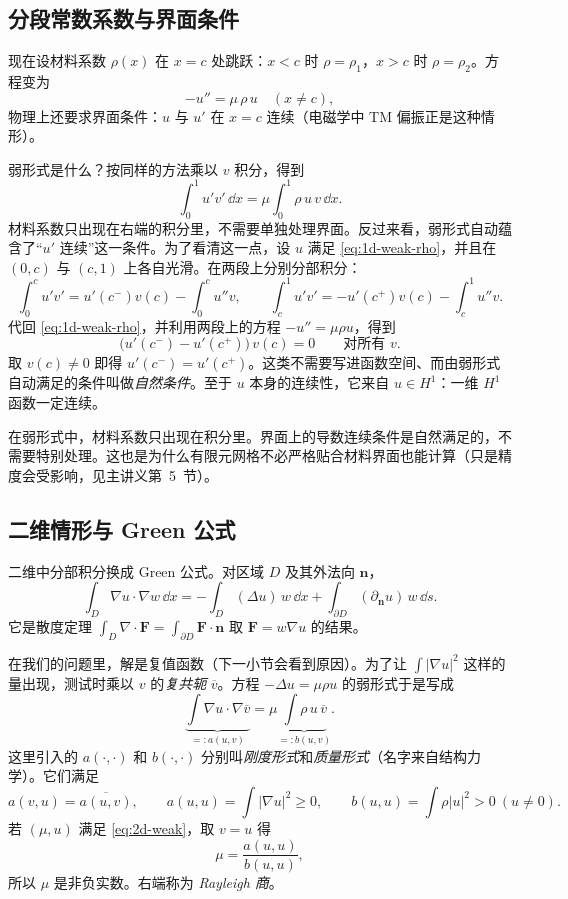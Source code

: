 \documentclass[11pt,a4paper,fontset=fandol]{ctexart}
\begin{document}
\subsection{分段常数系数与界面条件}

现在设材料系数 $\rho(x)$ 在 $x=c$ 处跳跃：$x<c$ 时 $\rho=\rho_1$，$x>c$ 时 $\rho=\rho_2$。方程变为
\[
-u''=\mu\,\rho\,u\quad (x\ne c),
\]
物理上还要求界面条件：$u$ 与 $u'$ 在 $x=c$ 连续（电磁学中 TM 偏振正是这种情形）。

弱形式是什么？按同样的方法乘以 $v$ 积分，得到
\begin{equation}
\label{eq:1d-weak-rho}
\int_0^1 u'v'\,\dd x=\mu\int_0^1 \rho\,u\,v\,\dd x .
\end{equation}
材料系数只出现在右端的积分里，不需要单独处理界面。反过来看，弱形式自动蕴含了“$u'$ 连续”这一条件。为了看清这一点，设 $u$ 满足 \eqref{eq:1d-weak-rho}，并且在 $(0,c)$ 与 $(c,1)$ 上各自光滑。在两段上分别分部积分：
\[
\int_0^c u'v'=u'(c^-)v(c)-\int_0^c u''v,\qquad
\int_c^1 u'v'=-u'(c^+)v(c)-\int_c^1 u''v .
\]
代回 \eqref{eq:1d-weak-rho}，并利用两段上的方程 $-u''=\mu\rho u$，得到
\[
\bigl(u'(c^-)-u'(c^+)\bigr)\,v(c)=0\qquad\text{对所有 }v .
\]
取 $v(c)\ne0$ 即得 $u'(c^-)=u'(c^+)$。这类不需要写进函数空间、而由弱形式自动满足的条件叫做\emph{自然条件}。至于 $u$ 本身的连续性，它来自 $u\in H^1$：一维 $H^1$ 函数一定连续。

\begin{keypoint}
在弱形式中，材料系数只出现在积分里。界面上的导数连续条件是自然满足的，不需要特别处理。这也是为什么有限元网格不必严格贴合材料界面也能计算（只是精度会受影响，见主讲义第~5~节）。
\end{keypoint}

\subsection{二维情形与 Green 公式}

二维中分部积分换成 Green 公式。对区域 $D$ 及其外法向 $\bm n$，
\begin{equation}
\label{eq:green}
\int_D \nabla u\cdot\nabla w\,\dd x=-\int_D(\Delta u)\,w\,\dd x+\int_{\partial D}(\partial_{\bm n}u)\,w\,\dd s .
\end{equation}
它是散度定理 $\int_D\nabla\cdot\bm F=\int_{\partial D}\bm F\cdot\bm n$ 取 $\bm F=w\nabla u$ 的结果。

在我们的问题里，解是复值函数（下一小节会看到原因）。为了让 $\int|\nabla u|^2$ 这样的量出现，测试时乘以 $v$ 的\emph{复共轭} $\overline v$。方程 $-\Delta u=\mu\rho u$ 的弱形式于是写成
\begin{equation}
\label{eq:2d-weak}
\underbrace{\int\nabla u\cdot\nabla\overline v}_{=:a(u,v)}=\mu\underbrace{\int\rho\,u\,\overline v}_{=:b(u,v)} .
\end{equation}
这里引入的 $a(\cdot,\cdot)$ 和 $b(\cdot,\cdot)$ 分别叫\emph{刚度形式}和\emph{质量形式}（名字来自结构力学）。它们满足
\[
a(v,u)=\overline{a(u,v)},\qquad a(u,u)=\int|\nabla u|^2\ge0,\qquad b(u,u)=\int\rho|u|^2>0\ (u\ne0).
\]
若 $(\mu,u)$ 满足 \eqref{eq:2d-weak}，取 $v=u$ 得
\begin{equation}
\label{eq:rayleigh}
\mu=\frac{a(u,u)}{b(u,u)} ,
\end{equation}
所以 $\mu$ 是非负实数。右端称为 \emph{Rayleigh 商}。
\end{document}
